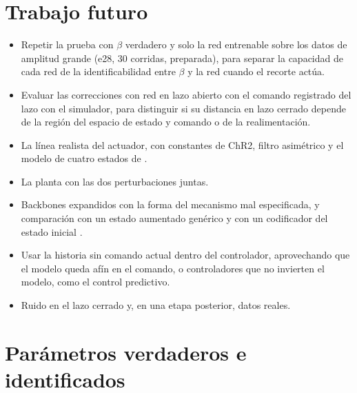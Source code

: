 \documentclass[11pt,a4paper]{article}
\begin{document}
\section{Trabajo futuro}

\begin{itemize}[leftmargin=*,itemsep=0.25em]
\item Repetir la prueba con $\beta$ verdadero y solo la red entrenable sobre los datos de amplitud grande (e28, 30 corridas, preparada), para separar la capacidad de cada red de la identificabilidad entre $\beta$ y la red cuando el recorte actúa.
\item Evaluar las correcciones con red en lazo abierto con el comando registrado del lazo con el simulador, para distinguir si su distancia en lazo cerrado depende de la región del espacio de estado y comando o de la realimentación.
\item La línea realista del actuador, con constantes de ChR2, filtro asimétrico y el modelo de cuatro estados de \cite{williams2013}.
\item La planta con las dos perturbaciones juntas.
\item Backbones expandidos con la forma del mecanismo mal especificada, y comparación con un estado aumentado genérico \cite{dupont2019} y con un codificador del estado inicial \cite{beintema2021}.
\item Usar la historia sin comando actual dentro del controlador, aprovechando que el modelo queda afín en el comando, o controladores que no invierten el modelo, como el control predictivo.
\item Ruido en el lazo cerrado y, en una etapa posterior, datos reales.
\end{itemize}

\printbibliography[title={Referencias}]

\appendix
\section{Parámetros verdaderos e identificados}
\label{ap:parametros}
\end{document}
